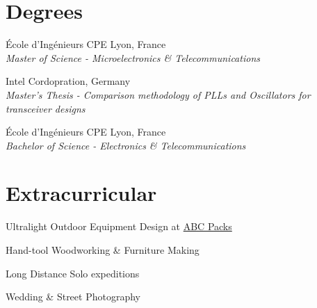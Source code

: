 \documentclass[10pt,a4paper]{moderncv}
\newcommand*{\makeeducationparagraph}[3]{
  {#2, #3}\\
  {\itshape #1}
  \par\addvspace{1em}
  }
\begin{document}
\section{Degrees}

  \makeeducationparagraph{Master of Science - Microelectronics \& Telecommunications}
    {École d'Ingénieurs CPE Lyon}
    {France}

    \makeeducationparagraph{Master's Thesis - Comparison methodology of PLLs and Oscillators for transceiver designs}
    {Intel Cordopration}
    {Germany}

    \makeeducationparagraph{Bachelor of Science - Electronics \& Telecommunications}
    {École d'Ingénieurs CPE Lyon}
    {France}


\section{Extracurricular}

  Ultralight Outdoor Equipment Design at \href{https://abcpacks.com}{ABC Packs}
  \par Hand-tool Woodworking \& Furniture Making
  \par Long Distance Solo expeditions
  \par Wedding \& Street Photography

\clearpage


\end{document}
